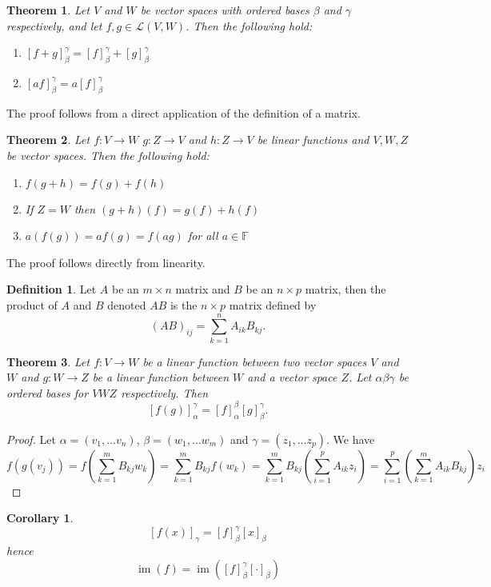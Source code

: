 \documentclass[oneside, 12pt]{book}
\DeclareMathOperator{\im}{im}
\newtheorem{thm}{Theorem}[section]
\newtheorem{cor}{Corollary}[section]
\theoremstyle{definition}
\newtheorem{defn}{Definition}[section]
\begin{document}
\begin{thm}
  \label{thm_matsum}
  Let $V$ and $W$ be vector spaces with ordered bases $\beta$ and $\gamma$ respectively, and let $f,g \in \mathcal{L}(V,W)$. Then the following hold:
  \begin{enumerate}
          \item $[f+g]_{\beta}^{\gamma}=[f]_{\beta}^{\gamma}+[g]_{\beta}^{\gamma}$
          \item $[af]_{\beta}^{\gamma}=a[f]_{\beta}^{\gamma}$
  \end{enumerate}
\end{thm}
The proof follows from a direct application of the definition of a matrix.
\begin{thm}
  \label{thm_matcomp}
  Let $f:V \to W$ $g:Z \to V$ and $h:Z \to V$ be linear functions and $V,W, Z$ be vector spaces. Then the following hold:
  \begin{enumerate}
    \item $f(g+h)=f(g)+f(h)$
    \item If $Z=W$ then $(g+h)(f)=g(f)+h(f)$
    \item $a(f(g))=af(g)=f(ag)$ for all $a \in \mathbb{F}$
  \end{enumerate}
\end{thm}
The proof follows directly from linearity.
\begin{defn}
  \label{defn_matprod}
  Let $A$ be an $m \times n$ matrix and $B$ be an $n \times p$ matrix, then the product of $A$ and $B$ denoted $AB$ is the $n \times p$ matrix defined by
  \[(AB)_{ij}=\sum_{k=1}^{n}A_{ik}B_{kj}.\]
\end{defn}
\begin{thm}
  \label{thm_matprod}
  Let $f: V \to W$ be a linear function between two vector spaces $V$ and $W$ and $g: W \to Z$ be a linear function between $W$ and a vector space $Z$. Let $\alpha \beta \gamma$ be ordered bases for $V W Z$ respectively. Then
  \[[f(g)]_{\alpha}^{\gamma}=[f]_{\alpha}^{\beta}[g]_{\beta}^{\gamma}.\]
\end{thm}
\begin{proof}
  Let $\alpha=(v_{1}, \dots v_{n})$, $\beta=(w_{1}, \dots w_{m})$ and $\gamma=(z_{1}, \dots z_{p})$. We have \[f(g(v_{j}))=f(\sum_{k=1}^{m}B_{kj}w_{k})=\sum_{k=1}^{m}B_{kj}f(w_{k})=\sum_{k=1}^{m}B_{kj}(\sum_{i=1}^{p}A_{ik}z_{i})=\sum_{i=1}^{p}(\sum_{k=1}^{m}A_{ik}B_{kj})z_{i}\]
\end{proof}
\begin{cor}
  \label{cor_colvec}
  \[[f(x)]_{\gamma}=[f]_{\beta}^{\gamma}[x]_{\beta}\] hence \[\im(f)=\im([f]_{\beta}^{\gamma}[\cdot]_{\beta})\]
\end{cor}
\end{document}
